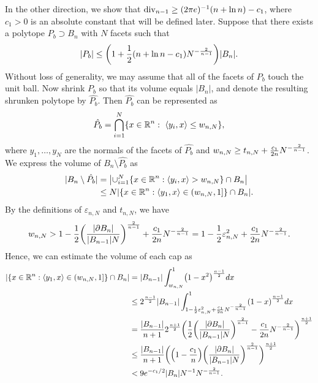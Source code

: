 In the other direction, we show that $\operatorname{div}_{n-1} \geq (2\pi e)^{-1}(n+\ln n) - c_1$, where $ c_1 > 0  $ is an absolute constant that will be defined later. Suppose that there exists a polytope $P_b \supset B_n$ with $N$ facets such that \[ |P_b| \leq \left(1+\frac{1}{2}(n + \ln n- c_1)\NN\right)|B_n|.\]   Without loss of generality, we may assume that all of the facets of $P_b$ touch the unit ball.
Now  shrink $P_b$ so that its volume equals $ |B_n|$, and  denote the resulting shrunken polytope by $ \hat{P_b}.$ Then $\hat{P_b}$ can be represented as %
\[
\hat{P_b} = \bigcap_{i=1}^{N}\{x\in\operatorname{\mathbb{R}}^{n}:\ \langle y_i, x \rangle \leq w_{n,N}\},
\] where $y_1,\dots,y_N$ are the normals of the facets of $\hat{P_b}$ and $w_{n,N} \geq t_{n,N} +\frac{c_1}{2n}N^{-\frac 2{n-1}}$. We express the volume of $B_n\setminus \hat{P_b}$ as
\begin{align}\label{eq:a1}
|B_n \setminus \hat{P_b}| &= \left|\cup_{i=1}^{N}\{x\in\R^{n}:\inneri{y_i}{x} > w_{n,N} \} \cap B_n\right|  \nonumber\\
&\leq N|\{x\in\R^{n}:\inneri{y_1}{x} \in (w_{n,N},1]\} \cap B_n| .
\end{align}
By the definitions of $\varepsilon_{n,N}$ and $t_{n,N}$,  we have
\[ 
w_{n,N} >1-\frac{1}{2}\left(\frac{|\partial B_n|}{|B_{n-1}|N}\right)^{\frac{2}{n-1}}+\frac{c_1}{2n}\NN
=1-\frac{1}{2}\varepsilon_{n,N}^2+\frac{c_1}{2n}\NN.
\]
Hence, we can estimate the volume of each cap as%
\begin{align}{\label{eq:a2}}
|\{x\in\R^{n}:\inneri{y_1}{x} \in (w_{n,N},1]\} \cap B_n|
&=|B_{n-1}|\int_{w_{n,N}}^{1}\left(1-x^{2}\right)^{\frac{n-1}{2}}dx \nonumber\\
& \leq 2^{\frac{n-1}{2}}|B_{n-1}|\int_{1-\frac{1}{2}\varepsilon_{n,N}^2+\frac{c_1}{2n}\NN}^{1}\left(1-x\right)^{\frac{n-1}{2}}dx\nonumber\\
& =\frac{|B_{n-1}|}{n+1}2^{\frac{n+1}{2}}\bigg(\frac{1}{2}\left(\frac{|\partial B_n|}{|B_{n-1}|N}\right)^{\frac{2}{n-1}}-\frac{c_1}{2n}\NN\bigg)^{\frac{n+1}{2}} \nonumber\\
& \leq\frac{|B_{n-1}|}{n+1}\bigg(\left(1-\frac{c_1}{n}\right)\left(\frac{|\partial B_n|}{|B_{n-1}|N}\right)^{\frac{2}{n-1}}\bigg)^{\frac{n+1}{2}} \nonumber\\
& < 9e^{-c_1/2}|B_n|N^{-1}N^{-\frac{2}{n-1}}.
\end{align}

